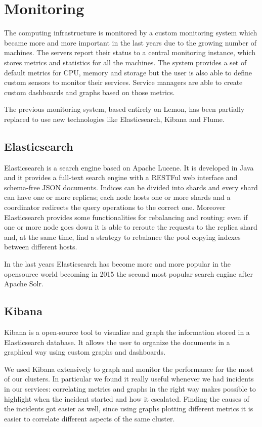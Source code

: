 \section{Monitoring}

The computing infrastructure is monitored by a custom monitoring system
which became more and more important in the last years due to the growing
number of machines. The servers report their status to a central
monitoring instance, which stores metrics and statistics for all the
machines. The system provides a set of default metrics for CPU, memory and
storage but the user is also able to define custom sensors to monitor
their services. Service managers are able to create custom dashboards and
graphs based on those metrics.

The previous monitoring system, based entirely on Lemon, has been
partially replaced to use new technologies like Elasticsearch, Kibana and
Flume. 

\subsection{Elasticsearch}

Elasticsearch is a search engine based on Apache Lucene. It is developed
in Java and it provides a full-text search engine with a RESTFul web
interface and schema-free JSON documents. Indices can be divided into
shards and every shard can have one or more replicas; each node hosts one
or more shards and a coordinator redirects the query operations to the
correct one. Moreover Elasticsearch provides some functionalities for
rebalancing and routing: even if one or more node goes down it is able to
reroute the requests to the replica shard and, at the same time, find
a strategy to rebalance the pool copying indexes between different
hosts.

In the last years Elasticsearch has become more and more popular in the
opensource world becoming in 2015 the second most popular search engine
after Apache Solr.

\subsection{Kibana}

Kibana is a open-source tool to visualize and graph the information
stored in a Elasticsearch database. It allows the user to organize the
documents in a graphical way using custom graphs and dashboards.

We used Kibana extensively to graph and monitor the performance for the
most of our clusters. In particular we found it really useful whenever we
had incidents in our services: correlating metrics and graphs in the right
way makes possible to highlight when the incident started and how it
escalated. Finding the causes of the incidents got easier as well, since
using graphs plotting different metrics it is easier to correlate
different aspects of the same cluster.

